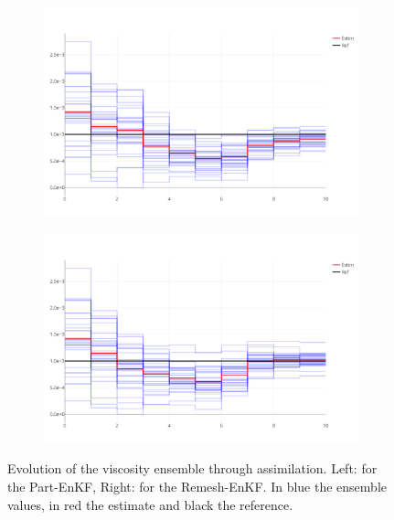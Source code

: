 \begin{figure}[htbp]
	\centering
	\begin{subfigure}{0.49\linewidth}
		\includegraphics*[width=\linewidth]{images/app2d/visc_ppf.png}
	\end{subfigure}
	\begin{subfigure}{0.49\linewidth}
		\includegraphics*[width=\linewidth]{images/app2d/visc_rmf.png}
	\end{subfigure}
	\caption{Evolution of the viscosity ensemble through assimilation. Left: for the Part-EnKF, Right: for the Remesh-EnKF. In blue the ensemble values, in red the estimate and black the reference.}
	\label{fig:visc_time}
\end{figure}

